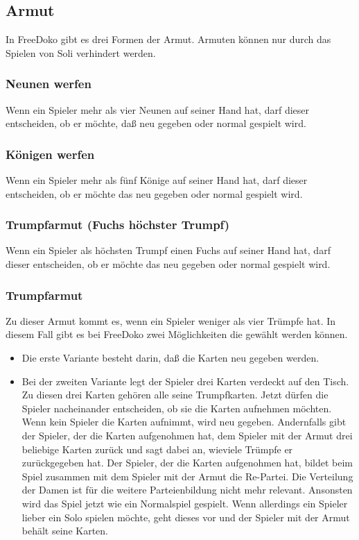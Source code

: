 \documentclass{scrartcl}
\begin{document}
\subsection{Armut}
In FreeDoko gibt es \optional drei Formen der Armut.  Armuten können nur durch das Spielen von Soli verhindert werden.

\subsubsection{Neunen werfen}
Wenn ein Spieler mehr als vier Neunen auf seiner Hand hat, darf dieser entscheiden, ob er möchte, daß neu gegeben oder normal gespielt wird.

\subsubsection{Königen werfen}
Wenn ein Spieler mehr als fünf Könige auf seiner Hand hat, darf dieser entscheiden, ob er möchte das neu gegeben oder normal gespielt wird.

\subsubsection{Trumpfarmut (Fuchs höchster Trumpf)}
Wenn ein Spieler als höchsten Trumpf einen Fuchs auf seiner Hand hat, darf dieser entscheiden, ob er möchte das neu gegeben oder normal gespielt wird.

\subsubsection{Trumpfarmut}
Zu dieser Armut kommt es, wenn ein Spieler weniger als vier Trümpfe hat. In diesem Fall gibt es bei FreeDoko zwei Möglichkeiten die \optional gewählt werden können.
\begin{itemize}
  \item
    Die erste Variante besteht darin, daß die Karten neu gegeben werden.
  \item
    Bei der zweiten Variante legt der Spieler drei Karten verdeckt
    auf den Tisch. Zu diesen drei Karten gehören alle seine
    Trumpfkarten. Jetzt dürfen die Spieler nacheinander entscheiden,
    ob sie die Karten aufnehmen möchten. Wenn kein Spieler die
    Karten aufnimmt, wird neu gegeben. Andernfalls gibt der Spieler,
    der die Karten aufgenohmen hat, dem Spieler mit der Armut drei
    beliebige Karten zurück und sagt dabei an, wieviele Trümpfe er
    zurückgegeben hat. Der Spieler, der die Karten aufgenohmen hat,
    bildet beim Spiel zusammen mit dem Spieler mit der Armut die
    Re-Partei. Die Verteilung der \kreuz Damen ist für die weitere
    Parteienbildung nicht mehr relevant. Ansonsten wird das Spiel
    jetzt wie ein Normalspiel gespielt. Wenn allerdings ein Spieler
    lieber ein Solo spielen möchte, geht dieses vor und der Spieler
    mit der Armut behält seine Karten.
\end{itemize}
\end{document}
